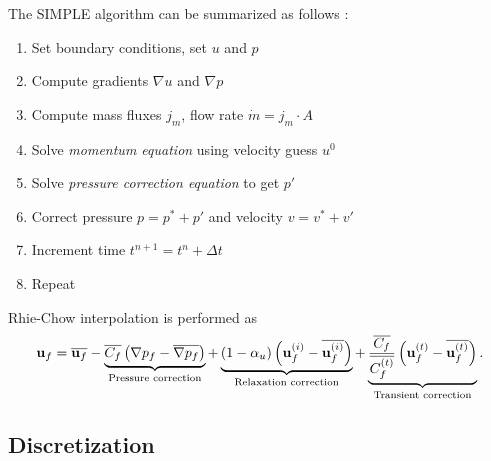 \documentclass[12pt]{article}
\newcommand{\lb}{\left(}
\newcommand{\rb}{\right)}
\newcommand{\vb}[1]{\text{\textbf{#1}}}
\begin{document}
The SIMPLE algorithm can be summarized as follows \cite{mou, pat}:
\begin{enumerate}
\item Set boundary conditions, set $u$ and $p$
\item Compute gradients $\nabla u$ and $\nabla p$
\item Compute mass fluxes $j_m$, flow rate $\dot m = j_m \cdot A$
\item Solve \textit{momentum equation} using velocity guess $u^0$
\item Solve \textit{pressure correction equation} to get $p'$
\item Correct pressure $p = p^* + p'$ and velocity $v = v^* + v'$
\item Increment time $t^{n+1} = t^n + \Delta t$
\item Repeat
\end{enumerate}
Rhie-Chow interpolation is performed as \cite{mou}
$$
\vb u_f = \overline{\vb u_f} - \underbrace{\overline{C_f} \lb \nabla p_f - \overline{\nabla p_f} \rb}_\text{Pressure correction} + \underbrace{(1 - \alpha_u) \lb \vb u_f^{(i)} - \overline{\vb u_f^{(i)}} \rb}_\text{Relaxation correction} + \underbrace{\frac{\overline{C_f}}{\overline{C_f^{(t)}}} \lb \vb u_f^{(t)} - \overline{\vb u_f^{(t)}} \rb}_\text{Transient correction}.
$$

\subsection{Discretization}
\end{document}

